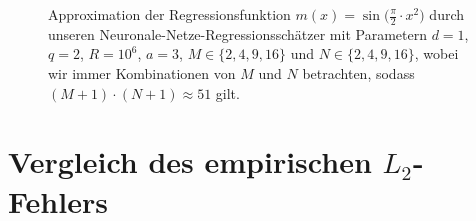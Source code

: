 \begin{figure}
    \begin{subfigure}[b]{0.5\textwidth}
        \centering
        \scalebox{0.9}{
          }
          \label{test2}
    \end{subfigure}
    \begin{subfigure}[b]{0.5\textwidth}
    \centering
    \scalebox{0.9}{
           }
           \label{fig:test}
    \end{subfigure}
       \hspace{0.1cm}
    \begin{subfigure}[b]{0.5\textwidth}
    \centering
    \scalebox{0.9}{
	}
	\label{teat1}
    \end{subfigure}
    \begin{subfigure}[b]{0.5\textwidth}
    \centering
     \scalebox{0.9}{
           }
           \label{test3}
    \end{subfigure}
    \begin{subfigure}[b]{1\textwidth}
        \centering
    \end{subfigure}
     \caption{Approximation der Regressionsfunktion $m(x) = \sin\big(\frac{\pi}{2} \cdot x^2\big)$ durch unseren Neuronale-Netze-Regressionsschätzer mit Parametern $d = 1$, $q = 2$, $R = 10^6$, $a = 3$, $M \in \{2,4,9,16\}$ und $N \in \{2,4,9,16\}$, wobei wir immer Kombinationen von $M$ und $N$ betrachten, sodass $(M + 1)\cdot(N + 1) \approx 51$ gilt.}
    \label{fig:subfig.a.5}
\end{figure}

\clearpage
\section{Vergleich des empirischen $L_2$-Fehlers}

